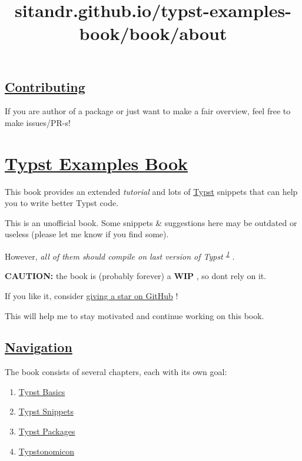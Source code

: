 \subsection{\texorpdfstring{\hyperref[contributing]{Contributing}}{Contributing}}\label{contributing}

If you are author of a package or just want to make a fair overview,
feel free to make issues/PR-s!


\title{sitandr.github.io/typst-examples-book/book/about}

\section{\texorpdfstring{\hyperref[typst-examples-book]{Typst Examples
Book}}{Typst Examples Book}}\label{typst-examples-book}

This book provides an extended \emph{tutorial} and lots of
\href{https://github.com/typst/typst}{Typst} snippets that can help you
to write better Typst code.

This is an unofficial book. Some snippets \& suggestions here may be
outdated or useless (please let me know if you find some).

However, \emph{all of them should compile on last version of Typst
\textsuperscript{\hyperref[1]{1}}} .

\textbf{CAUTION:} the book is (probably forever) a \textbf{WIP} , so
don\textquotesingle t rely on it.

If you like it, consider
\href{https://github.com/sitandr/typst-examples-book}{giving a star on
GitHub} !

This will help me to stay motivated and continue working on this book.

\subsection{\texorpdfstring{\hyperref[navigation]{Navigation}}{Navigation}}\label{navigation}

The book consists of several chapters, each with its own goal:

\begin{enumerate}
\tightlist
\item
  \href{./basics/index.html}{Typst Basics}
\item
  \href{./snippets/index.html}{Typst Snippets}
\item
  \href{./packages/index.html}{Typst Packages}
\item
  \href{./typstonomicon/index.html}{Typstonomicon}
\end{enumerate}

